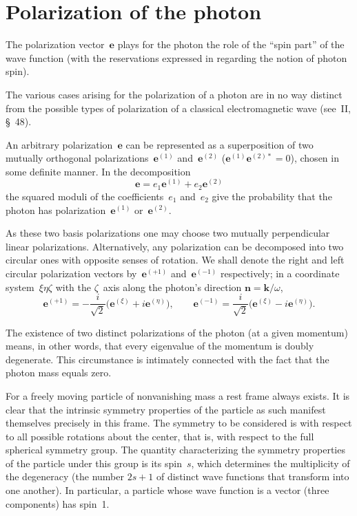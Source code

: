 \section{Polarization of the photon}

The polarization vector~$\mathbf{e}$ plays for the photon the role of the ``spin part'' of the wave function (with the reservations expressed in  regarding the notion of photon spin).

The various cases arising for the polarization of a photon are in no way distinct from the possible types of polarization of a classical electromagnetic wave (see~II, \S~48).

An arbitrary polarization~$\mathbf{e}$ can be represented as a superposition of two mutually orthogonal polarizations~$\mathbf{e}^{(1)}$ and~$\mathbf{e}^{(2)}$ ($\mathbf{e}^{(1)}\mathbf{e}^{(2)*} = 0$), chosen in some definite manner. In the decomposition
\begin{equation}
\mathbf{e} = e_1\mathbf{e}^{(1)} + e_2\mathbf{e}^{(2)}
\tag{8.1}
\end{equation}
the squared moduli of the coefficients~$e_1$ and~$e_2$ give the probability that the photon has polarization~$\mathbf{e}^{(1)}$ or~$\mathbf{e}^{(2)}$.

As these two basis polarizations one may choose two mutually perpendicular linear polarizations. Alternatively, any polarization can be decomposed into two circular ones with opposite senses of rotation. We shall denote the right and left circular polarization vectors by~$\mathbf{e}^{(+1)}$ and~$\mathbf{e}^{(-1)}$ respectively; in a coordinate system~$\xi\eta\zeta$ with the $\zeta$~axis along the photon's direction $\mathbf{n} = \mathbf{k}/\omega$,
\begin{equation}
\mathbf{e}^{(+1)} = -\frac{i}{\sqrt{2}}\bigl(\mathbf{e}^{(\xi)} + i\mathbf{e}^{(\eta)}\bigr), \qquad \mathbf{e}^{(-1)} = \frac{i}{\sqrt{2}}\bigl(\mathbf{e}^{(\xi)} - i\mathbf{e}^{(\eta)}\bigr).
\tag{8.2}
\end{equation}

The existence of two distinct polarizations of the photon (at a given momentum) means, in other words, that every eigenvalue of the momentum is doubly degenerate. This circumstance is intimately connected with the fact that the photon mass equals zero.

For a freely moving particle of nonvanishing mass a rest frame always exists. It is clear that the intrinsic symmetry properties of the particle as such manifest themselves precisely in this frame. The symmetry to be considered is with respect to all possible rotations about the center,
that is, with respect to the full spherical symmetry group. The quantity characterizing the symmetry properties of the particle under this group is its spin~$s$, which determines the multiplicity of the degeneracy (the number $2s + 1$ of distinct wave functions that transform into one another). In particular, a particle whose wave function is a vector (three components) has spin~1.

